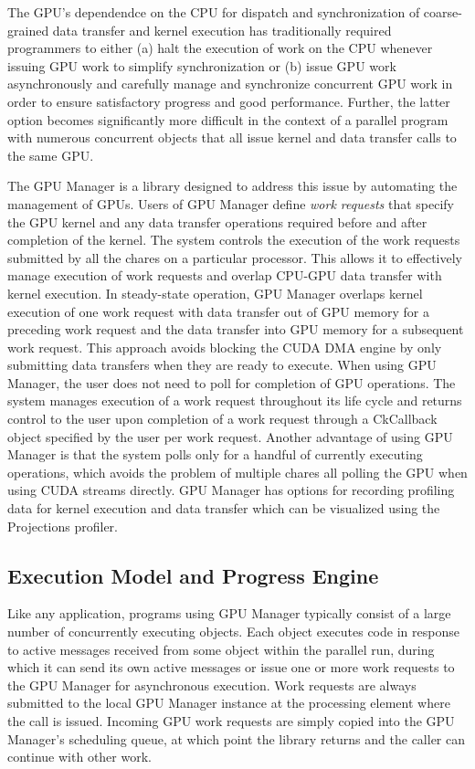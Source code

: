 \documentclass[10pt]{report}
\begin{document}
The GPU's dependendce on the CPU for dispatch and synchronization of
coarse-grained data transfer and kernel execution has traditionally required
programmers to either (a) halt the execution of work on the CPU whenever issuing
GPU work to simplify synchronization or (b) issue GPU work asynchronously and
carefully manage and synchronize concurrent GPU work in order to ensure
satisfactory progress and good performance. Further, the latter option becomes
significantly more difficult in the context of a parallel program with numerous
concurrent objects that all issue kernel and data transfer calls to the same GPU.

The \charmpp{} GPU Manager is a library designed to address this issue by
automating the management of GPUs. Users of GPU Manager define \emph{work requests}
that specify the GPU kernel and any data transfer operations required before
and after completion of the kernel. The system controls the execution of the
work requests submitted by all the chares on a particular processor. This allows
it to effectively manage execution of work requests and overlap CPU-GPU data
transfer with kernel execution. In steady-state operation, GPU Manager overlaps
kernel execution of one work request with data transfer out of GPU memory for a
preceding work request and the data transfer into GPU memory for a subsequent
work request. This approach avoids blocking the CUDA DMA engine by only submitting
data transfers when they are ready to execute. When using GPU Manager, the user
does not need to poll for completion of GPU operations. The system manages
execution of a work request throughout its life cycle and returns control to the
user upon completion of a work request through a CkCallback object specified by
the user per work request. Another advantage of using GPU Manager is that the
system polls only for a handful of currently executing operations, which avoids
the problem of multiple chares all polling the GPU when using CUDA streams
directly. GPU Manager has options for recording profiling data for kernel
execution and data transfer which can be visualized using the \charmpp{}
Projections profiler.

\subsection{Execution Model and Progress Engine}

Like any \charmpp{} application, programs using GPU Manager typically consist of a
large number of concurrently executing objects. Each object executes code in
response to active messages received from some object within the parallel run,
during which it can send its own active messages or issue one or more work
requests to the GPU Manager for asynchronous execution. Work requests are always
submitted to the local GPU Manager instance at the processing element where the
call is issued. Incoming GPU work requests are simply copied into the GPU
Manager's scheduling queue, at which point the library returns and the caller
can continue with other work.
\end{document}
